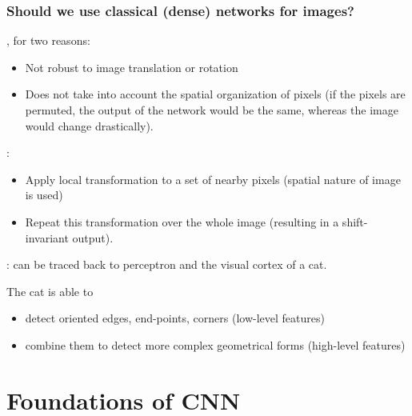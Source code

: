 \begin{frame}
\frametitle{Should we use classical (dense) networks for images?}

, for two reasons:
	\begin{itemize}
		\item Not robust to image translation or rotation
		\item Does not take into account the spatial organization of pixels (if the pixels are permuted, the output of the network would be the same, whereas the image would change drastically).
	\end{itemize}

\medskip

:
\begin{itemize}
	\item Apply local transformation to a set of nearby pixels (spatial nature of image is used)
	\item Repeat this transformation over the whole image (resulting in a shift-invariant output).
\end{itemize}

\medskip

: can be traced back to perceptron and the visual cortex of a cat.

The cat is able to
\begin{itemize}
	\item detect oriented edges, end-points, corners (low-level features)
	\item combine them to detect more complex geometrical forms (high-level features)
\end{itemize}



\end{frame}


\section{Foundations of CNN}



